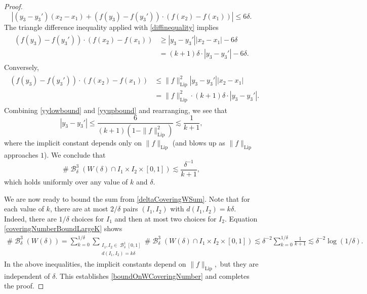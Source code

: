 \documentclass[dvipsnames,letterpaper,12pt]{article}
\numberwithin{equation}{section}
\theoremstyle{plain}
\theoremstyle{remark}
\DeclareMathOperator{\B}{\mathcal{B}}
\begin{document}
\begin{proof}
	\begin{equation} \label{diffinequality}
		\left| \left( y_3 - y_3' \right) (x_2 - x_1) + (f(y_3) - f(y_3')) \cdot (f(x_2) - f(x_1)) \right| \leq 6\delta.
	\end{equation}
	The triangle difference inequality applied with \eqref{diffinequality} implies
	\begin{align} \label{yylowbound}
	\begin{split}
		(f(y_3) - f(y_3')) \cdot (f(x_2) - f(x_1)) &\geq |y_3 - y_3'||x_2-x_1| - 6\delta\\ &= (k+1)\delta \cdot |y_3 - y_3'| - 6 \delta.
	\end{split}
	\end{align}
	Conversely,
	\begin{align} \label{yyupbound}
	\begin{split}
		(f(y_3) - f(y_3')) \cdot (f(x_2) - f(x_1)) &\leq \| f \|_{\text{Lip}}^2 |y_3 - y_3'| |x_2 - x_1| \\ &=  \| f \|_{\text{Lip}}^2 \cdot (k+1) \delta \cdot |y_3 - y_3'|.
	\end{split}
	\end{align}
	Combining \eqref{yylowbound} and \eqref{yyupbound} and rearranging, we see that
	\begin{equation} \label{y3minusY3Prime}
		|y_3 - y_3'| \leq \frac{6}{(k+1)(1 - \| f \|_{\text{Lip}}^2)}  \lesssim\frac{1}{k+1},
	\end{equation} 
	where the implicit constant depends only on $\| f \|_{\text{Lip}}$ (and blows up as $\| f \|_{\text{Lip}}$ approaches $1$).  We conclude that
	\begin{equation}\label{coveringNumberBoundLargeK}
		\# \B^3_\delta(W(\delta) \cap I_1 \times I_2 \times [0,1]) \lesssim \frac{\delta^{-1}}{k+1},
	\end{equation}
	which holds uniformly over any value of $k$ and $\delta$.

	We are now ready to bound the sum from \eqref{deltaCoveringWSum}. Note that for each value of $k$, there are at most $2/\delta$ pairs $(I_1,I_2)$ with $d(I_1,I_2) = k \delta$. Indeed, there are $1/\delta$ choices for $I_1$ and then at most two choices for $I_2$. Equation  \eqref{coveringNumberBoundLargeK} shows 
	\begin{align*}
		\# \B^3_\delta(W(\delta)) = \sum_{k = 0}^{1/\delta} \sum_{\substack{I_1, I_2 \in \B^1_\delta[0,1]\\d(I_1,I_2) = k\delta}} \# \B^3_\delta(W(\delta) \cap I_1 \times I_2 \times [0,1])
		\lesssim \delta^{-2} \sum_{k = 0}^{1/\delta} \frac{1}{k+1}
		\lesssim \delta^{-2}\log(1/\delta).
	\end{align*}
In the above inequalities, the implicit constants depend on $\| f \|_{\text{Lip}},$ but they are independent of $\delta$. This establishes \eqref{boundOnWCoveringNumber} and completes the proof.
\end{proof}



\end{document}
